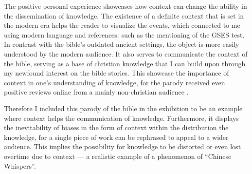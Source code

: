 \documentclass[a4paper,11pt]{article}
\begin{document}
The positive personal experience showcases how context can change the ability in the dissemination of knowledge. The existence of a definite context that is set in the modern era helps the reader to visualize the events, which connected to me using modern language and references: such as the mentioning of the GSES test. In contrast with the bible's outdated ancient settings, the object is more easily understood by the modern audience. It also serves to communicate the context of the bible, serving as a base of christian knowledge that I can build upon through my newfound interest on the bible stories. This showcase the importance of context in one's understanding of knowledge, for the parody received even positive reviews online from a mainly non-christian audience \parencite{Review}.




Therefore I included this parody of the bible in the exhibition to be an example where context helps the communication of knowledge. Furthermore, it displays the inevitability of biases in the form of context within the distribution the knowledge, for a single piece of work can be rephrased to appeal to a wider audience. This implies the possibility for knowledge to be distorted or even lost overtime due to context --- a realistic example of a phenomenon of ``Chinese Whispers''.

\end{document}
